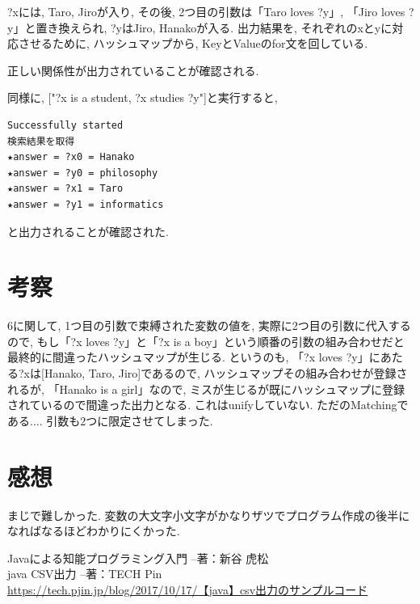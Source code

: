\documentclass[uplatex,12pt]{jsarticle}
\begin{document}
?xには, Taro, Jiroが入り, その後, 2つ目の引数は「Taro loves ?y」, 「Jiro loves ?y」と置き換えられ, ?yはJiro, Hanakoが入る. 出力結果を, それぞれのxとyに対応させるために, ハッシュマップから, KeyとValueのfor文を回している.

正しい関係性が出力されていることが確認される.

同様に, ["?x is a student, ?x studies ?y"]と実行すると,
\begin{lstlisting}
Successfully started
検索結果を取得
★answer = ?x0 = Hanako
★answer = ?y0 = philosophy
★answer = ?x1 = Taro
★answer = ?y1 = informatics
\end{lstlisting}
と出力されることが確認された.


\section{考察}
6に関して, 1つ目の引数で束縛された変数の値を, 実際に2つ目の引数に代入するので, もし「?x loves ?y」と「?x is a boy」という順番の引数の組み合わせだと最終的に間違ったハッシュマップが生じる. というのも, 「?x loves ?y」にあたる?xは[Hanako, Taro, Jiro]であるので, ハッシュマップその組み合わせが登録されるが, 「Hanako is a girl」なので, ミスが生じるが既にハッシュマップに登録されているので間違った出力となる.
これはunifyしていない. ただのMatchingである....
引数も2つに限定させてしまった.


\section{感想}
まじで難しかった.
変数の大文字小文字がかなりザツでプログラム作成の後半になればなるほどわかりにくかった.

\begin{thebibliography}{99}
 Javaによる知能プログラミング入門 --著：新谷 虎松 \\
 java CSV出力 --著：TECH Pin \\
\url{https://tech.pjin.jp/blog/2017/10/17/【java】csv出力のサンプルコード}
\end{thebibliography}
\end{document}
